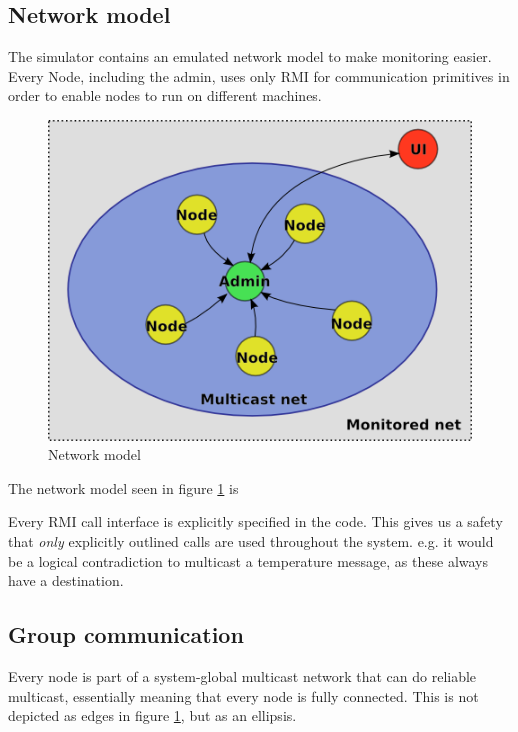 \documentclass[10pt,a4paper]{article}
\begin{document}
\subsection{Network model}
The simulator contains an emulated network model to make monitoring easier. Every Node, including the admin, uses only RMI for communication primitives in order to enable nodes to run on different machines.

\begin{figure}[h]
\centering
\includegraphics[scale=0.65]{fig/Networkmodel.png}
 \caption{Network model}
 \label{fig:network_model}
\end{figure}

The network model seen in figure \ref{fig:network_model} is 


Every RMI call interface is explicitly specified in the code. This gives us a safety that \emph{only} explicitly outlined calls are used throughout the system. e.g. it would be a logical contradiction to multicast a temperature message, as these always have a destination.

\subsection{Group communication}
Every node is part of a system-global multicast network that can do reliable multicast, essentially meaning that every node is fully connected. This is not depicted as edges in figure \ref{fig:network_model}, but as an ellipsis.
\end{document}

